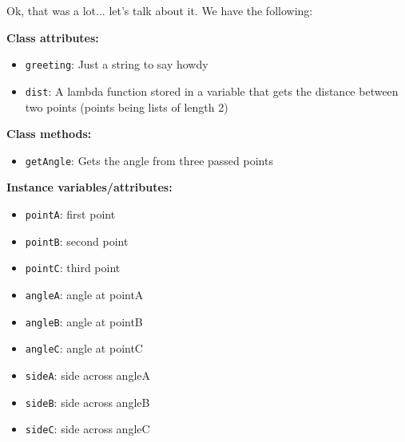 \documentclass[12pt, twoside, reqno]{book}
\begin{document}
Ok, that was a lot... let's talk about it. We have the following:

\textbf{Class attributes:}
\begin{itemize}[itemsep=2px, parsep=0pt]
\item \texttt{greeting}: Just a string to say howdy
\item \texttt{dist}: A lambda function stored in a variable that gets the distance between two points (points being lists of length 2)
\end{itemize}

\textbf{Class methods:}
\begin{itemize}[itemsep=2px, parsep=0pt] \item \texttt{getAngle}: Gets the angle from three passed points\end{itemize}

\textbf{Instance variables/attributes:}
\begin{itemize}[itemsep=2px, parsep=0pt]
\item \texttt{pointA}: first point
\item \texttt{pointB}: second point
\item \texttt{pointC}: third point
\item \texttt{angleA}: angle at pointA
\item \texttt{angleB}: angle at pointB
\item \texttt{angleC}: angle at pointC
\item \texttt{sideA}: side across angleA
\item \texttt{sideB}: side across angleB
\item \texttt{sideC}: side across angleC
\end{itemize}
\end{document}
